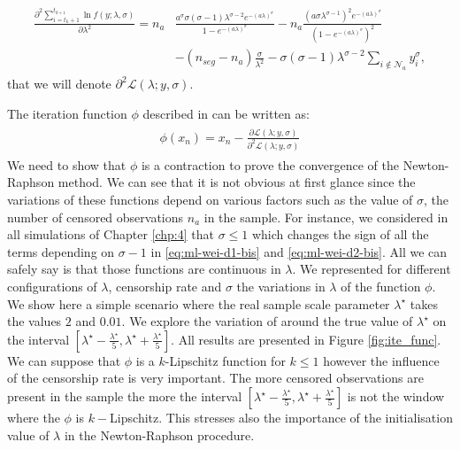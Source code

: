 \begin{appendices}
\begin{align}\label{eq:ml-wei-d2-bis}
\begin{split}
\frac{\partial^2\sum_{i=t_{k}+1}^{t_{k+1}}\ln f(y;\lambda,\sigma)}{\partial \lambda^2} =  n_a&\frac{a^\sigma\sigma(\sigma-1)\lambda^{\sigma-2}e^{-(a\lambda)^\sigma}}{1-e^{-(a\lambda)^\sigma}}-n_a\frac{(a\sigma\lambda^{\sigma-1})^2e^{-(a\lambda)^\sigma}}{(1-e^{-(a\lambda)^\sigma})^2} \\
&-(n_{seg}-n_a)\frac{\sigma}{\lambda^2}-\sigma(\sigma-1)\lambda^{\sigma-2}\sum_{i \notin \mathcal{N}_a}y_i^\sigma, 
\end{split}
\end{align}
that we will denote $\partial^2\mathcal{L}(\lambda;y,\sigma)$.

The iteration function $\phi$ described in \cite{Verbeke1995} can be written as:  
\begin{align}\label{ite:func}
\begin{split}
\phi(x_n) = x_n - \frac{\partial\mathcal{L}(\lambda;y,\sigma)}{\partial^2\mathcal{L}(\lambda;y,\sigma)}
\end{split}
\end{align}
We need to show that $\phi$ is a contraction to prove the convergence of the Newton-Raphson method. We can see that it is not obvious at first glance since the variations of these functions depend on various factors such as the value of $\sigma$, the number of censored observations $n_a$ in the sample. For instance, we considered in all simulations of Chapter \ref{chp:4} that $\sigma \leq 1$ which changes the sign of all the terms depending on $\sigma-1$ in \ref{eq:ml-wei-d1-bis} and \ref{eq:ml-wei-d2-bis}. All we can safely say is that those functions are continuous in $\lambda$. We represented for different configurations of $\lambda$, censorship rate and $\sigma$ the variations in $\lambda$ of the function $\phi$. We show here a simple scenario where the real sample scale parameter $\lambda^\star$ takes the values $2$ and $0.01$. We explore the variation of around the true value of $\lambda^\star$ on the interval $[\lambda^\star-\frac{\lambda^\star}{5},\lambda^\star+\frac{\lambda^\star}{5}]$. All results are presented in Figure \ref{fig:ite_func}. We can suppose that $\phi$ is a $k$-Lipschitz function for $k \leq 1$ however the influence of the censorship rate is very important. The more censored observations are present in the sample the more the interval $[\lambda^\star-\frac{\lambda^\star}{5},\lambda^\star+\frac{\lambda^\star}{5}]$ is not the window where the $\phi$ is $k-$Lipschitz. This stresses also the importance of the initialisation value of $\lambda$ in the Newton-Raphson procedure. 


\end{appendices}
